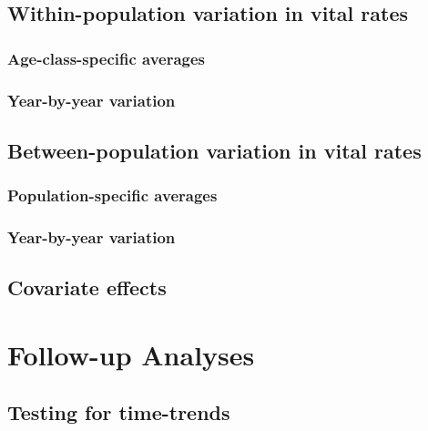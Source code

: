 \documentclass[
]{book}
\begin{document}
\hypertarget{within-population-variation-in-vital-rates}{%
\section{Within-population variation in vital rates}\label{within-population-variation-in-vital-rates}}

\hypertarget{age-class-specific-averages}{%
\subsection{Age-class-specific averages}\label{age-class-specific-averages}}

\hypertarget{year-by-year-variation}{%
\subsection{Year-by-year variation}\label{year-by-year-variation}}

\hypertarget{between-population-variation-in-vital-rates}{%
\section{Between-population variation in vital rates}\label{between-population-variation-in-vital-rates}}

\hypertarget{population-specific-averages}{%
\subsection{Population-specific averages}\label{population-specific-averages}}

\hypertarget{year-by-year-variation-1}{%
\subsection{Year-by-year variation}\label{year-by-year-variation-1}}

\hypertarget{covariate-effects}{%
\section{Covariate effects}\label{covariate-effects}}

\hypertarget{AddAnalyses}{%
\chapter{Follow-up Analyses}\label{AddAnalyses}}

\hypertarget{testing-for-time-trends}{%
\section{Testing for time-trends}\label{testing-for-time-trends}}
\end{document}
